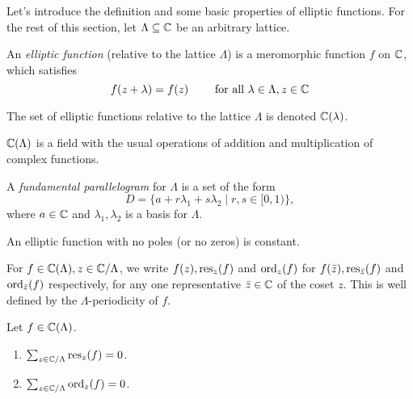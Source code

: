 Let's introduce the definition and some basic properties of elliptic functions.
For the rest of this section,
let $\Lambda \subseteq \mathbb{C}$ be an arbitrary lattice.

\begin{definition}
	An \emph{elliptic function} (relative to the lattice $\Lambda$)
	is a meromorphic function
	$f$ on $\mathbb{C}$, which satisfies
	\begin{equation*}
		f(z + \lambda) = f(z)\qquad\textrm{ for all } \lambda \in \Lambda, z \in \mathbb{C}
	\end{equation*}
\end{definition}

\begin{notation}
	The set of elliptic functions relative to the lattice $\Lambda$ is denoted
	$\mathbb{C}(\lambda)$.
\end{notation}

\begin{remark}
	$\mathbb{C}(\Lambda)$ is a field with the usual operations of 
	addition and multiplication of complex functions.
\end{remark}

\begin{definition}
	A \emph{fundamental parallelogram} for $\Lambda$ is a set of the form
	\begin{equation*}
		D = \{a + r \lambda_1 + s \lambda_2 \mid r, s \in [0, 1)\},
	\end{equation*}
	where $a \in \mathbb{C}$ and $\lambda_1, \lambda_2$ is a basis for $\Lambda$.
\end{definition}

\begin{proposition}
	\label{prop:no-poles}
	An elliptic function with no poles (or no zeros) is constant.
\end{proposition}

\begin{notation}
	For $f \in \mathbb{C}(\Lambda), z \in \mathbb{C}/\Lambda$, we write $f(z), \operatorname{res}_z(f)$ and $\operatorname{ord}_z(f)$ for
	$f(\bar{z}), \operatorname{res}_{\bar{z}}(f)$ and $\operatorname{ord}_{\bar{z}}(f)$ respectively,
	for any one representative
	$\bar{z} \in \mathbb{C}$ of the coset $z$. This is well defined by the
	$\Lambda$-periodicity of $f$.
\end{notation}

\begin{proposition}
	\label{prop:residue}
	Let $f \in \mathbb{C}(\Lambda)$.
	\begin{enumerate}[label=(\alph*)]
		\item $\sum_{z \in \mathbb{C}/\Lambda} \operatorname{res}_z(f) = 0$.
		\item $\sum_{z \in \mathbb{C}/\Lambda} \operatorname{ord}_z(f) = 0$.
	\end{enumerate}
\end{proposition}

